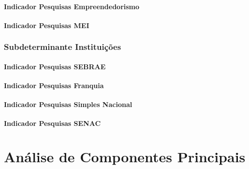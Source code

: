 \documentclass[
  12,
  dvipsnames]{article}
\begin{document}
\hypertarget{indicador-pesquisas-empreendedorismo}{%
\paragraph{Indicador Pesquisas
Empreendedorismo}\label{indicador-pesquisas-empreendedorismo}}

\hypertarget{indicador-pesquisas-mei}{%
\paragraph{Indicador Pesquisas MEI}\label{indicador-pesquisas-mei}}

\hypertarget{subdeterminante-instituiuxe7uxf5es}{%
\subsubsection{Subdeterminante
Instituições}\label{subdeterminante-instituiuxe7uxf5es}}

\hypertarget{indicador-pesquisas-sebrae}{%
\paragraph{Indicador Pesquisas
SEBRAE}\label{indicador-pesquisas-sebrae}}

\hypertarget{indicador-pesquisas-franquia}{%
\paragraph{Indicador Pesquisas
Franquia}\label{indicador-pesquisas-franquia}}

\hypertarget{indicador-pesquisas-simples-nacional}{%
\paragraph{Indicador Pesquisas Simples
Nacional}\label{indicador-pesquisas-simples-nacional}}

\hypertarget{indicador-pesquisas-senac}{%
\paragraph{Indicador Pesquisas SENAC}\label{indicador-pesquisas-senac}}

\hypertarget{anuxe1lise-de-componentes-principais}{%
\section{Análise de Componentes
Principais}\label{anuxe1lise-de-componentes-principais}}
\end{document}
